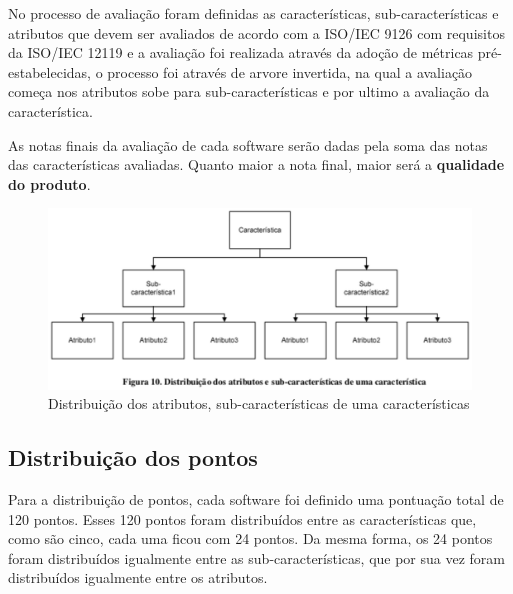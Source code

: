   No processo de avaliação foram definidas as características, sub-características e atributos que devem ser avaliados de acordo com a
  ISO/IEC 9126 com requisitos da ISO/IEC 12119 e a avaliação foi realizada através da adoção de métricas pré-estabelecidas, o processo
  foi através de arvore invertida, na qual a avaliação começa nos atributos sobe para sub-características e por ultimo a avaliação da
  característica.

  As notas finais da avaliação de cada software serão dadas pela soma das notas das características avaliadas. Quanto maior a
  nota final, maior será a \textbf{qualidade do produto}.

  \begin{figure}[!h]
    \centering
    \includegraphics[width=15cm, keepaspectratio=true]{figuras/ferramentas/caracteristicas.eps}
    \caption{Distribuição dos atributos, sub-características de uma características}
  \end{figure}

\subsection{Distribuição dos pontos}

  Para a distribuição de pontos, cada software foi definido uma pontuação total de 120 pontos. Esses 120 pontos foram distribuídos
  entre as características que, como são cinco, cada uma ficou com 24 pontos. Da mesma forma, os 24 pontos foram distribuídos
  igualmente entre as sub-características, que por sua vez foram distribuídos igualmente entre os atributos.

